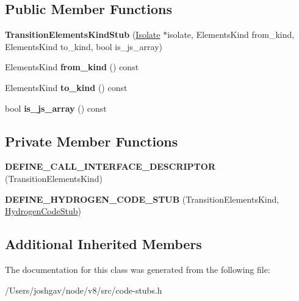 \subsection*{Public Member Functions}
\begin{DoxyCompactItemize}
\item 
{\bfseries Transition\+Elements\+Kind\+Stub} (\hyperlink{classv8_1_1internal_1_1_isolate}{Isolate} $\ast$isolate, Elements\+Kind from\+\_\+kind, Elements\+Kind to\+\_\+kind, bool is\+\_\+js\+\_\+array)\hypertarget{classv8_1_1internal_1_1_transition_elements_kind_stub_afb9b2f6dcdfec61b5cf9078a5680b7c7}{}\label{classv8_1_1internal_1_1_transition_elements_kind_stub_afb9b2f6dcdfec61b5cf9078a5680b7c7}

\item 
Elements\+Kind {\bfseries from\+\_\+kind} () const \hypertarget{classv8_1_1internal_1_1_transition_elements_kind_stub_a2683c6a10b54a37563dd27eb36acb6fe}{}\label{classv8_1_1internal_1_1_transition_elements_kind_stub_a2683c6a10b54a37563dd27eb36acb6fe}

\item 
Elements\+Kind {\bfseries to\+\_\+kind} () const \hypertarget{classv8_1_1internal_1_1_transition_elements_kind_stub_ad63378af89698f65e013c16f976fcdd3}{}\label{classv8_1_1internal_1_1_transition_elements_kind_stub_ad63378af89698f65e013c16f976fcdd3}

\item 
bool {\bfseries is\+\_\+js\+\_\+array} () const \hypertarget{classv8_1_1internal_1_1_transition_elements_kind_stub_aa4734b5a0a96867b3ca289fd38bf9ea7}{}\label{classv8_1_1internal_1_1_transition_elements_kind_stub_aa4734b5a0a96867b3ca289fd38bf9ea7}

\end{DoxyCompactItemize}
\subsection*{Private Member Functions}
\begin{DoxyCompactItemize}
\item 
{\bfseries D\+E\+F\+I\+N\+E\+\_\+\+C\+A\+L\+L\+\_\+\+I\+N\+T\+E\+R\+F\+A\+C\+E\+\_\+\+D\+E\+S\+C\+R\+I\+P\+T\+OR} (Transition\+Elements\+Kind)\hypertarget{classv8_1_1internal_1_1_transition_elements_kind_stub_a5cad82ae80977414dba1ec04ef6396ea}{}\label{classv8_1_1internal_1_1_transition_elements_kind_stub_a5cad82ae80977414dba1ec04ef6396ea}

\item 
{\bfseries D\+E\+F\+I\+N\+E\+\_\+\+H\+Y\+D\+R\+O\+G\+E\+N\+\_\+\+C\+O\+D\+E\+\_\+\+S\+T\+UB} (Transition\+Elements\+Kind, \hyperlink{classv8_1_1internal_1_1_hydrogen_code_stub}{Hydrogen\+Code\+Stub})\hypertarget{classv8_1_1internal_1_1_transition_elements_kind_stub_a15dac09182d8cf36e1f343430acaffd5}{}\label{classv8_1_1internal_1_1_transition_elements_kind_stub_a15dac09182d8cf36e1f343430acaffd5}

\end{DoxyCompactItemize}
\subsection*{Additional Inherited Members}


The documentation for this class was generated from the following file\+:\begin{DoxyCompactItemize}
\item 
/\+Users/joshgav/node/v8/src/code-\/stubs.\+h\end{DoxyCompactItemize}
